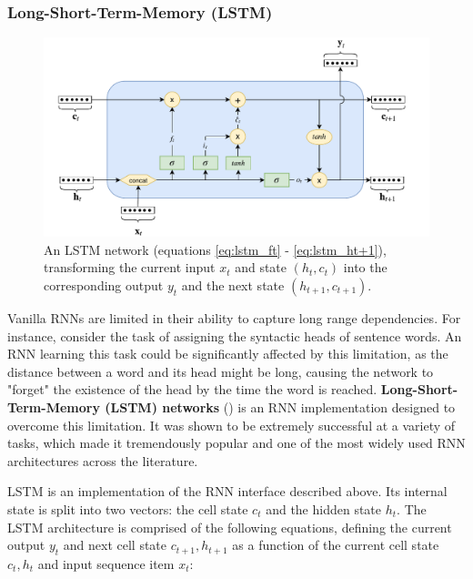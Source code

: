 \subsubsection{Long-Short-Term-Memory (LSTM)}

\begin{figure}
    \centering
    \includegraphics[width=1\textwidth]{Figures/lstm.pdf}
    \caption{An LSTM network (equations \ref{eq:lstm_ft} - \ref{eq:lstm_ht+1}), transforming the current input $x_t$ and state $(h_t,c_t)$ into the corresponding output $y_t$ and the next state $(h_{t+1},c_{t+1})$.}
    \label{fig:lstm}
\end{figure}

Vanilla RNNs are limited in their ability to capture long range dependencies. For instance, consider the task of assigning the syntactic heads of sentence words. An RNN learning this task could be significantly affected by this limitation, as the distance between a word and its head might be long, causing the network to "forget" the existence of the head by the time the word is reached. \textbf{Long-Short-Term-Memory (LSTM) networks} (\cite{lstm}) is an RNN implementation designed to overcome this limitation. It was shown to be extremely successful at a variety of tasks, which made it tremendously popular and one of the most widely used RNN architectures across the literature.  

LSTM is an implementation of the RNN interface described above. Its internal state is split into two vectors: the cell state $c_t$ and the hidden state $h_t$. The LSTM architecture is comprised of the following equations, defining the current output $y_t$ and next cell state $c_{t + 1}, h_{t + 1}$ as a function of the current cell state $c_t, h_t$ and input sequence item $x_t$:

